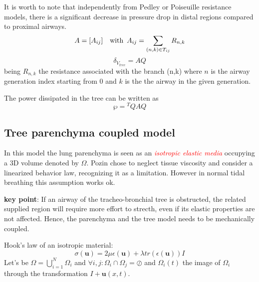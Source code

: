 \documentclass[11pt]{article}
\begin{document}
It is worth to note that independently from Pedley or Poiseuille resistance models, there is a significant decrease in pressure drop in distal regions compared to proximal airways.
$$A= [A_{ij}] \hspace{1em} \text{with} \hspace{0.5em} A_{ij} = \sum_{(n,k)\in T_{ij}}R_{n,k}$$
$$\delta_{V_{tree}}=AQ$$
being $R_{n,k}$ the resistance associated with the branch (n,k) where $n$ is the airway generation index starting from 0 and $k$ is the the airway in the given generation.

The power dissipated in the tree can be written as
$$\wp = {}^TQAQ$$
\subsection{Tree parenchyma coupled model}
In this model the lung parenchyma is seen as an \textcolor{red}{\emph{isotropic elastic media}} occupying a 3D volume denoted by $\Omega$. Pozin chose to neglect tissue viscosity and consider a linearized behavior law, recognizing it as a limitation. However in normal tidal breathing this assumption works ok.
\begin{mdframed}
\textbf{key point}: If an airway of the tracheo-bronchial tree is obstructed, the related supplied region will require more effort to strecth, even if its elastic properties are not affected. Hence, the parenchyma and the tree model needs to be mechanically coupled.
\end{mdframed}
Hook's law of an isotropic material:
$$\sigma (\textbf{u}) = 2\mu \epsilon (\textbf{u}) + \lambda tr(\epsilon (\textbf{u}))I$$
Let's be $\Omega = \bigcup^{N}_{i=1}\Omega_i$ and $\forall i,j : \Omega_i \cap\Omega_j = \oslash$ and $\Omega_i(t)$ the image of $\Omega_i$ through the transformation $I + \textbf{u}(x,t)$.
\end{document}

